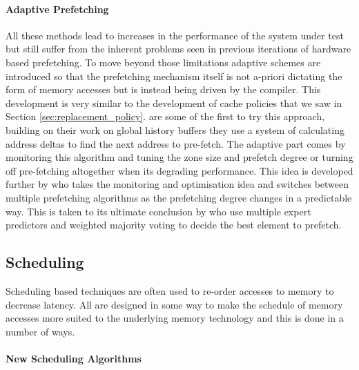\paragraph{Adaptive Prefetching}

All these methods lead to increases in the performance of the system under test but still suffer from the inherent problems seen in previous iterations of hardware based prefetching. To move beyond those limitations adaptive schemes are introduced so that the prefetching mechanism itself is not a-priori dictating the form of memory accesses but is instead being driven by the compiler. This development is very similar to the development of cache policies that we saw in Section \ref{sec:replacement_policy}. \citet{nesbitACDCAdaptive2004} are some of the first to try this approach, building on their work on global history buffers \cite{nesbitDataCachePrefetching2004} they use a system of calculating address deltas to find the next address to pre-fetch. The adaptive part comes by monitoring this algorithm and tuning the zone size and prefetch degree or turning off pre-fetching altogether when its degrading performance. This idea is developed further by \citet{aroraCompositeDataPrefetcher2014} who takes the monitoring and optimisation idea and switches between multiple prefetching algorithms as the prefetching degree changes in a predictable way. This is taken to its ultimate conclusion by \citet{pandaExpertPrefetchPrediction2016} who use multiple expert predictors and weighted majority voting to decide the best element to prefetch.

\subsection{Scheduling}

Scheduling based techniques are often used to re-order accesses to memory to decrease latency. All are designed in some way to make the schedule of memory accesses more suited to the underlying memory technology and this is done in a number of ways. 

\paragraph{New Scheduling Algorithms}

